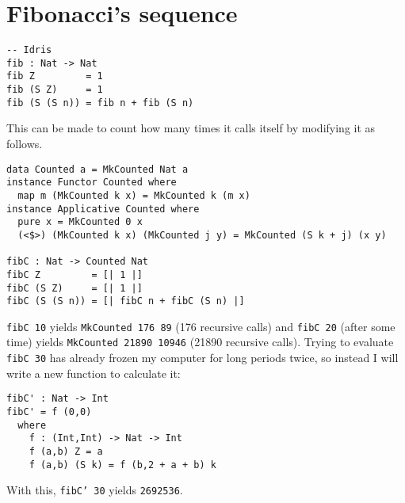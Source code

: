\documentclass[11pt]{article}
\begin{document}
\begin{minipage}{\linewidth}
\section{Fibonacci's sequence}
\begin{lstlisting}
-- Idris
fib : Nat -> Nat
fib Z         = 1
fib (S Z)     = 1
fib (S (S n)) = fib n + fib (S n)
\end{lstlisting}
This can be made to count how many times it calls itself by modifying it as follows.
\begin{lstlisting}
data Counted a = MkCounted Nat a
instance Functor Counted where
  map m (MkCounted k x) = MkCounted k (m x)
instance Applicative Counted where
  pure x = MkCounted 0 x
  (<$>) (MkCounted k x) (MkCounted j y) = MkCounted (S k + j) (x y)

fibC : Nat -> Counted Nat
fibC Z         = [| 1 |]
fibC (S Z)     = [| 1 |]
fibC (S (S n)) = [| fibC n + fibC (S n) |]
\end{lstlisting}
\end{minipage}
\begin{minipage}{\linewidth}
\texttt{fibC 10} yields \texttt{MkCounted 176 89} (176 recursive calls) and \texttt{fibC 20} (after some time) yields \texttt{MkCounted 21890 10946} (21890 recursive calls). Trying to evaluate \texttt{fibC 30} has already frozen my computer for long periods twice, so instead I will write a new function to calculate it:
\begin{lstlisting}
fibC' : Nat -> Int
fibC' = f (0,0)
  where
    f : (Int,Int) -> Nat -> Int
    f (a,b) Z = a
    f (a,b) (S k) = f (b,2 + a + b) k
\end{lstlisting}
With this, \texttt{fibC' 30} yields \texttt{2692536}.
\end{minipage}
\end{document}
